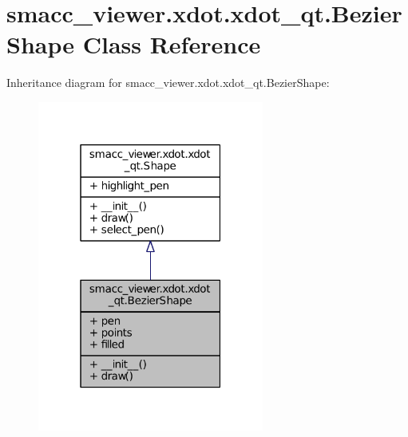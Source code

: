 \hypertarget{classsmacc__viewer_1_1xdot_1_1xdot__qt_1_1BezierShape}{}\section{smacc\+\_\+viewer.\+xdot.\+xdot\+\_\+qt.\+Bezier\+Shape Class Reference}
\label{classsmacc__viewer_1_1xdot_1_1xdot__qt_1_1BezierShape}


Inheritance diagram for smacc\+\_\+viewer.\+xdot.\+xdot\+\_\+qt.\+Bezier\+Shape\+:
\nopagebreak
\begin{figure}[H]
\begin{center}
\leavevmode
\includegraphics[width=211pt]{classsmacc__viewer_1_1xdot_1_1xdot__qt_1_1BezierShape__inherit__graph}
\end{center}
\end{figure}


